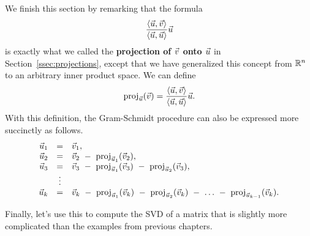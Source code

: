 \documentclass{ximera}
\begin{document}
We finish this section by remarking that the formula
\begin{equation*}
  \frac{\langle \vec{u},\vec{v} \rangle}{\langle \vec{u},\vec{u} \rangle}\vec{u}
\end{equation*}
is exactly what we called the \textbf{projection of $\vec{v}$ onto
  $\vec{u}$}%
%
%
 in Section~\ref{ssec:projections},
except that we have generalized this concept from $\mathbb{R}^n$ to an
arbitrary inner product space. We can define
\begin{equation*}
  \text{proj}_{\vec{u}}(\vec{v})
  = \frac{\langle \vec{u},\vec{v} \rangle}{\langle \vec{u},\vec{u} \rangle}\vec{u}.
\end{equation*}
With this definition, the Gram-Schmidt procedure can also be expressed
more succinctly as follows.
\begin{equation*}
  \begin{array}{rcl}
    \vec{u}_1
    &=& \vec{v}_1,
    \\
    \vec{u}_2
    &=& \vec{v}_2
        ~-~ \text{proj}_{\vec{u}_1}(\vec{v}_2),
    \\
    \vec{u}_3
    &=& \vec{v}_3
        ~-~ \text{proj}_{\vec{u}_1}(\vec{v}_3)
        ~-~ \text{proj}_{\vec{u}_2}(\vec{v}_3),
    \\
    &\vdots&
    \\
    \vec{u}_k
    &=& \vec{v}_k
        ~-~ \text{proj}_{\vec{u}_1}(\vec{v}_k)
        ~-~ \text{proj}_{\vec{u}_2}(\vec{v}_k)
        ~-~ \ldots
        ~-~ \text{proj}_{\vec{u}_{k-1}}(\vec{v}_k).
  \end{array}
\end{equation*}

Finally, let's use this to compute the SVD of a matrix that is slightly more complicated than the examples from previous chapters.
\end{document}
